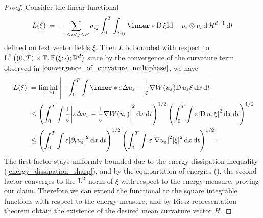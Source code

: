 \begin{proof}
	Consider the linear functional 
	\begin{equation*}
		L ( \xi )
		\coloneqq
		- \sum_{ 1 \leq i < j \leq P }
			\sigma_{ i j }
			\int_{ 0 }^{ T }
				\int_{ \Sigma_{ i j } }
					\inner*{ \diff \xi }{ \mathrm{Id} - \nu_{ i } \otimes \nu_{ 
					i } }
				\dd{ \hm^{ d - 1 } }
			\dd{ t }
	\end{equation*}
	defined on test vector fields $ \xi $. Then $ L $ is bounded with respect 
	to $ \operatorname{L}^{ 2 } \left( ( 0 , T ) \times \operatorname{\mathbb{T}} ,\operatorname{E} ( \xi ; \cdot ) 
	; \mathbb{ R }^{ d }
	 \right) $ since by the convergence of the curvature 
	term observed in $ \Cref{convergence_of_curvature_multiphase} $, we have
	\begin{align*}
		\abs{ L ( \xi ) }
		& =
		\liminf_{ \varepsilon \to 0 }
			\abs{ 
				-
				\int_{ 0 }^{ T }
					\int
						\inner*{
							\varepsilon \Delta u_{ \varepsilon } 
							-
							\frac{ 1 }{ \varepsilon }
							\nabla W ( u_{ \varepsilon } )
						}
						{ \diff u_{ \varepsilon } \xi }
					\dd{ x }
				\dd{ t }
			}
		\\
		& \leq
		\left(
			\int_{ 0 }^{ T }
				\int
					\frac{ 1 }{ \varepsilon }
					\abs{ 
						\varepsilon \Delta u_{ \varepsilon }
						-
						\frac{ 1 }{ \varepsilon }
						\nabla W ( u_{ \varepsilon } )
					}^{ 2 }
				\dd{ x }
			\dd{ t }
		\right)^{ 1/2 }
		\left(
			\int_{ 0 }^{ T }
				\int
					\varepsilon
					\abs{ \diff u_{ \varepsilon } \xi }^{ 2 }
				\dd{ x }
			\dd{ t }
		\right)^{ 1/2 }
		\\
		& \leq
				\left(
		\int_{ 0 }^{ T }
		\int
		 \varepsilon
		\abs{ 
		\partial_{ t } u_{ \varepsilon }
		}^{ 2 }
		\dd{ x }
		\dd{ t }
		\right)^{ 1/2 }
		\left(
		\int_{ 0 }^{ T }
		\int
		\varepsilon
		\abs{ \nabla u_{ \varepsilon } }^{ 2 }
		\abs{ \xi }^{ 2 }
		\dd{ x }
		\dd{ t }
		\right)^{ 1/2 }.
	\end{align*}
	The first factor stays uniformly bounded due to the energy dissipation 
	inequality (\ref{energy_dissipation_sharp}), and by the equipartition of 
	energies (), the second factor 
	converges to the $ \operatorname{L}^{ 2 } $-norm of $ \xi $ with respect to the energy 
	measure, proving our claim. Therefore we can extend the functional to 
	the square integrable functions with respect to the energy measure, and by 
	Riesz representation theorem obtain the existence of the desired mean 
	curvature vector $ H $.
	

\end{proof}

